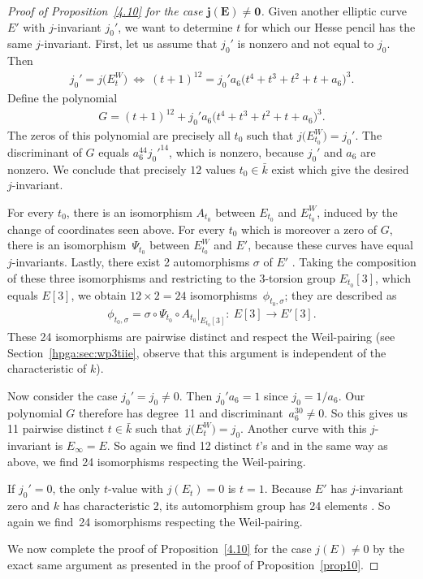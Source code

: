 \documentclass[pdftex]{sigma}
\numberwithin{equation}{section}
\begin{document}
\begin{proof}[Proof of Proposition~\ref{4.10} for the case $\boldsymbol{j(E) \neq 0}$]Given another elliptic curve $E'$ with $j$-in\-variant $j_0'$, we want to determine $t$ for which our Hesse pencil has the same $j$-invariant. First, let us assume that $j_0'$ is nonzero and not equal to $j_0$. Then
\begin{gather*}
j_0'=j\big(E^W_t\big) \ \Leftrightarrow \ (t+1)^{12} = j_0'a_6\big(t^4+t^3+t^2+t+a_6\big)^3.
\end{gather*}
Define the polynomial
\begin{gather*}G=(t+1)^{12} + j_0'a_6\big(t^4+t^3+t^2+t+a_6\big)^3.\end{gather*}
The zeros of this polynomial are precisely all $t_0$ such that $j\big(E_{t_0}^W\big)=j_0'$. The discriminant of $G$ equals $a_6^{44} j_0'^{14}$, which is nonzero, because $j_0'$ and $a_6$ are nonzero. We conclude that precisely $12$ values $t_0\in\bar{k}$ exist which give the desired $j$-invariant.

For every $t_0$, there is an isomorphism $A_{t_0}$ between $E_{t_0}$ and $E_{t_0}^W$, induced by the change of coordinates seen above. For every $t_0$ which is moreover a zero of $G$, there is an isomor\-phism~$\Psi _{t_0}$ between $E_{t_0}^W$ and $E'$, because these curves have equal $j$-invariants. Lastly, there exist 2 automorphisms $\sigma$ of $E'$ \cite[p.~410]{silverman1985}. Taking the composition of these three isomorphisms and restricting to the 3-torsion group $E_{t_0}[3]$, which equals $E[3]$, we obtain $12 \times 2 = 24$ isomor\-phisms~$\phi_{t_0,\sigma}$; they are described as
\begin{gather*}\phi_{t_0,\sigma} = \sigma \circ \Psi _{t_0} \circ A_{t_0}| _{E_{t_0}[3]}\colon \ E[3] \rightarrow E'[3].\end{gather*}
These 24 isomorphisms are pairwise distinct and respect the Weil-pairing (see Section~\ref{hpga:sec:wp3tiie}, observe that this argument is independent of the characteristic of $k$).

Now consider the case $j_0'=j_0 \neq 0$. Then $j_0'a_6=1$ since $j_0=1/a_6$. Our polynomial $G$ therefore has degree~11 and discriminant~$a_6^{30} \neq 0$. So this gives us 11 pairwise distinct $t\in\bar{k}$ such that $j\big(E_t^W\big)=j_0$. Another curve with this $j$-invariant is $E_{\infty}=E$. So again we find 12 distinct $t$'s and in the same way as above, we find 24 isomorphisms respecting the Weil-pairing.

If $j_0'=0$, the only $t$-value with $j(E_t)=0$ is $t=1$. Because $E'$ has $j$-invariant zero and $k$ has characteristic 2, its automorphism group has 24 elements \cite[p.~410]{silverman1985}. So again we find~24 isomorphisms respecting the Weil-pairing.

We now complete the proof of Proposition~\ref{4.10} for the case $j(E)\neq 0$ by the exact same argument as presented in the proof of Proposition~\ref{prop10}.
\end{proof}
\end{document}
